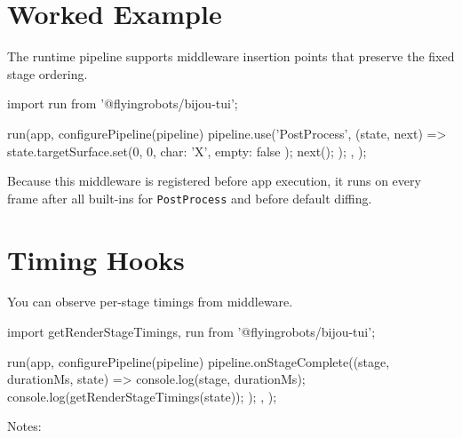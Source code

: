 \section{Worked Example}\label{record-014-worked-example}

The runtime pipeline supports middleware insertion points that preserve the fixed stage ordering.

\begin{CodeBlock}
import { run } from '@flyingrobots/bijou-tui';

run(app, {
  configurePipeline(pipeline) {
    pipeline.use('PostProcess', (state, next) => {
      state.targetSurface.set(0, 0, { char: 'X', empty: false });
      next();
    });
  },
});
\end{CodeBlock}

Because this middleware is registered before app execution, it runs on every frame after all built-ins for \texttt{P\allowbreak{}o\allowbreak{}s\allowbreak{}t\allowbreak{}P\allowbreak{}r\allowbreak{}o\allowbreak{}c\allowbreak{}e\allowbreak{}s\allowbreak{}s} and before default diffing.

\section{Timing Hooks}\label{record-014-timing-hooks}

You can observe per-stage timings from middleware.

\begin{CodeBlock}
import { getRenderStageTimings, run } from '@flyingrobots/bijou-tui';

run(app, {
  configurePipeline(pipeline) {
    pipeline.onStageComplete((stage, durationMs, state) => {
      console.log(stage, durationMs);
      console.log(getRenderStageTimings(state));
    });
  },
});
\end{CodeBlock}

Notes:

